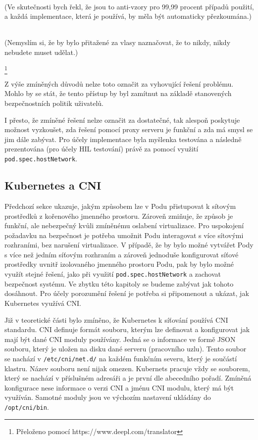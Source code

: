 \begin{displayquote}
\\(Ve skutečnosti bych řekl, že jsou to anti-vzory pro 99,99 procent případů použití, a každá implementace, která je používá, by měla být automaticky přezkoumána.)

\\(Nemyslím si, že by bylo přitažené za vlasy naznačovat, že to nikdy, nikdy nebudete muset udělat.)
\end{displayquote}
\cite{betz_2022_understanding} 
\footnote{Přeloženo pomocí https://www.deepl.com/translator}

Z výše zmíněných důvodů nelze toto označit za vyhovující řešení problému. Mohlo by se stát, že tento přístup by byl zamítnut na základě stanovených bezpečnostních politik uživatelů.

I přesto, že zmíněné řešení nelze označit za dostatečné, tak alespoň poskytuje možnost vyzkoušet, zda řešení pomocí proxy serveru je funkční a zda má smysl se jim dále zabývat. Pro účely implementace byla myšlenka testována a následně prezentována (pro účely HIL testování) právě za pomocí využití \verb|pod.spec.hostNetwork|.

\subsection{Kubernetes a CNI}
Předchozí sekce ukazuje, jakým způsobem lze v Podu přistupovat k sítovým prostředků z kořenového jmenného prostoru. Zároveň zmiňuje, že způsob je funkční, ale nebezpečný kvůli zmíněnému oslabení virtualizace. Pro uspokojení požadavku na bezpečnost je potřeba umožnit Podu interagovat s více sítovými rozhraními, bez narušení virtualizace. V případě, že by bylo možné vytvářet Pody s více než jedním síťovým rozhraním a zároveň jednoduše konfigurovat síťové prostředky uvnitř izolovaného jmenného prostoru Podu, pak by bylo možné využít stejné řešení, jako při využití \verb|pod.spec.hostNetwork| a zachovat bezpečnost systému. Ve zbytku této kapitoly se budeme zabývat jak tohoto dosáhnout. Pro účely porozumění řešení je potřeba si připomenout a ukázat, jak Kubernetes využívá CNI.

Již v teoretické části bylo zmíněno, že Kubernetes k síťování používá CNI standardu. CNI definuje formát souboru, kterým lze definovat a konfigurovat jak mají být dané CNI moduly používány. Jedná se o informace ve formě JSON souboru, který je uložen na disku dané serveru (pracovního uzlu). Tento soubor se nachází v \verb|/etc/cni/net.d/| na každém funkčním severu, který je součástí klastru. Název souboru není nijak omezen. Kubernets pracuje vždy se souborem, který se nachází v příslušném adresáři a je první dle abecedního pořadí. Zmíněná konfigurace nese informace o verzi CNI a jménu CNI modulu, který má být využíván. Samotné moduly jsou ve výchozím nastavení ukládány do \verb|/opt/cni/bin|. 

